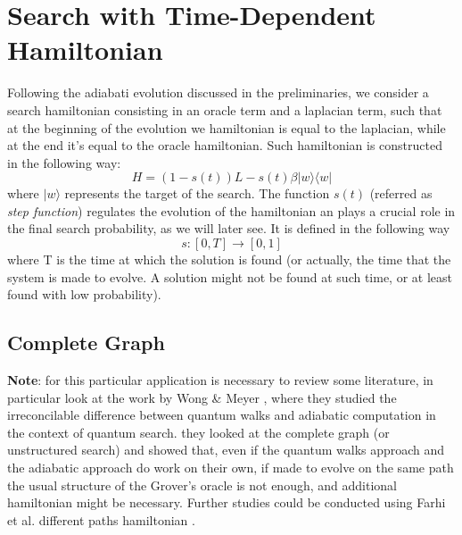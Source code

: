 \documentclass[11pt, twoside]{report}
\begin{document}
\section{Search with Time-Dependent Hamiltonian}
Following the adiabati evolution discussed in the preliminaries, we consider a search hamiltonian consisting in an oracle term and a laplacian term, such that at the beginning of the evolution we hamiltonian is equal to the laplacian, while at the end it's equal to the oracle hamiltonian. Such hamiltonian is constructed in the following way:
  \begin{equation}
    H = (1-s(t))L - s(t)\beta|w\rangle\langle w|
  \end{equation}
where $|w\rangle$ represents the target of the search.
The function $s(t)$ (referred as \textit{step function}) regulates the evolution of the hamiltonian an plays a  crucial role in the final search probability, as we will later see. It is defined in the following way
  \begin{equation}
    s: [0,T] \rightarrow [0,1]
  \end{equation}
where T is the time at which the solution is found (or actually, the time that the system is made to evolve. A solution might not be found at such time, or at least found with low probability).



\subsection{Complete Graph}
\textbf{Note}: for this particular application is necessary to review some literature, in particular look at the work by Wong \& Meyer \cite{Wong2016}, where they studied the irreconcilable difference between quantum walks and adiabatic computation in the context of quantum search. they looked at the complete graph (or unstructured search) and showed that, even if the quantum walks approach and the adiabatic approach do work on their own, if made to evolve on the same path the usual structure of the Grover's oracle is not enough, and additional hamiltonian might be necessary. Further studies could be conducted using Farhi et al. different paths hamiltonian \cite{Farhi2002}.
\end{document}
